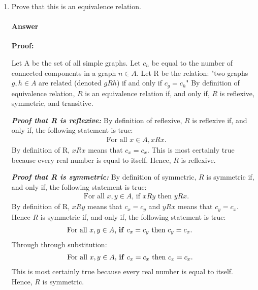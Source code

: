 \documentclass{article}
\begin{document}
\begin{enumerate}

    \item Prove that this is an equivalence relation.

        \paragraph{Answer}

        \textbf{Proof:}

        Let A be the set of all simple graphs. Let $c_{n}$ be equal to the number of connected components in a graph $n \in A$. Let R be the relation: "two graphs $g,h \in A$ are related (denoted $gRh$) if and only if $c_{g} = c_{h}$" By definition of equivalence relation, $R$ is an equivalence relation if, and only if, $R$ is reflexive, symmetric, and transitive.

        \emph{\textbf{Proof that R is reflexive:}} By definition of reflexive, $R$ is reflexive if, and only if, the following statement is true:
        \begin{align} &\nonumber \text{For all $x \in A, x R x$.}
        \end{align}
        By definition of R, $xRx$ means that $c_{x} = c_{x}$. This is most certainly true because every real number is equal to itself. Hence, $R$ is reflexive.

        \emph{\textbf{Proof that R is symmetric:}} By definition of symmetric, $R$ is symmetric if, and only if, the following statement is true:
        \begin{align} &\nonumber \text{For all $x,y \in A$, if $xRy$ then $yRx$.}
        \end{align}
        By definition of R, $xRy$ means that $c_{x} = c_{y}$ and $yRx$ means that $c_{y} = c_{x}$. Hence $R$ is symmetric if, and only if, the following statement is true:
        \begin{align} &\nonumber \text{For all $x,y \in A$, \textbf{if} $c_{x} = c_{y}$ then $c_{y} = c_{x}$.}
        \end{align}
        Through through substitution:
        \begin{align} &\nonumber \text{For all $x,y \in A$, \textbf{if} $c_{x} = c_{x}$ then $c_{x} = c_{x}$.}
        \end{align}
        This is most certainly true because every real number is equal to itself. Hence, $R$ is symmetric.


\end{enumerate}
\end{document}

